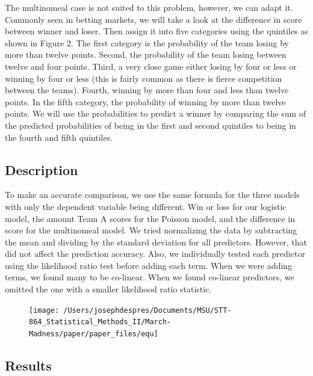 \documentclass[
  english,
  man,floatsintext]{apa6}
\begin{document}
The multinomeal case is not suited to this problem, however, we can adapt it. Commonly seen in betting markets, we will take a look at the difference in score between winner and loser. Then assign it into five categories using the quintiles as shown in Figure 2. The first category is the probability of the team losing by more than twelve points. Second, the probability of the team losing between twelve and four points. Third, a very close game either losing by four or less or winning by four or less (this is fairly common as there is fierce competition between the teams). Fourth, winning by more than four and less than twelve points. In the fifth category, the probability of winning by more than twelve points. We will use the probabilities to predict a winner by comparing the sum of the predicted probabilities of being in the first and second quintiles to being in the fourth and fifth quintiles.

\hypertarget{description}{%
\subsection{Description}\label{description}}

To make an accurate comparison, we use the same formula for the three models with only the dependent variable being different. Win or loss for our logistic model, the amount Team A scores for the Poisson model, and the difference in score for the multinomeal model. We tried normalizing the data by subtracting the mean and dividing by the standard deviation for all predictors. However, that did not affect the prediction accuracy. Also, we individually tested each predictor using the likelihood ratio test before adding each term. When we were adding terms, we found many to be co-linear. When we found co-linear predictors, we omitted the one with a smaller likelihood ratio statistic.

\begin{figure}
\texttt{[image: /Users/josephdespres/Documents/MSU/STT-864\_Statistical\_Methods\_II/March-Madness/paper/paper\_files/equ]} \end{figure}

\hypertarget{results}{%
\subsection{Results}\label{results}}
\end{document}
